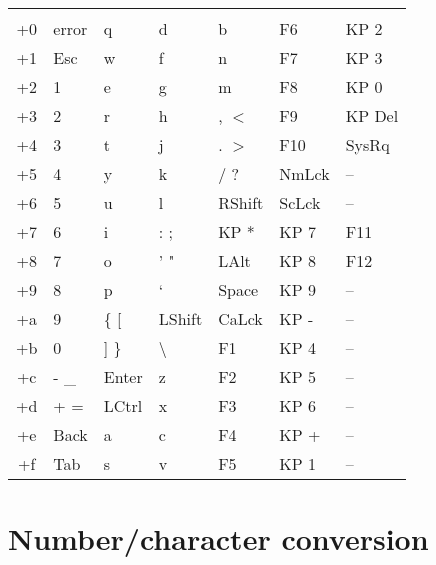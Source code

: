 \documentclass{refcard}
\begin{document}

\newcommand{\ppkey}{\textbackslash{} \textbar}

\begin{tabular}{C@{\hspace{6ex}}llllll}
	   &  &  &  &  &  &  \\[1ex]
	+0 & error  & q      & d      & b      & F6     & KP 2   \\
	+1 & Esc    & w      & f      & n      & F7     & KP 3   \\
	+2 & 1      & e      & g      & m      & F8     & KP 0   \\
	+3 & 2      & r      & h      & , $<$  & F9     & KP Del \\

	+4 & 3      & t      & j      & . $>$  & F10    & SysRq  \\
	+5 & 4      & y      & k      & / ?    & NmLck  & --     \\
	+6 & 5      & u      & l      & RShift & ScLck  & --     \\
	+7 & 6      & i      & : ;    & KP *   & KP 7   & F11    \\

	+8 & 7      & o      & ' "    & LAlt   & KP 8   & F12    \\
	+9 & 8      & p      & ` ~    & Space  & KP 9   & --     \\
	+a & 9      & \{ [   & LShift & CaLck  & KP -   & --     \\
	+b & 0      & ] \}   & \ppkey & F1     & KP 4   & --     \\

	+c & - \_   & Enter  & z      & F2     & KP 5   & --     \\
	+d & + =    & LCtrl  & x      & F3     & KP 6   & --     \\
	+e & Back   & a      & c      & F4     & KP +   & --     \\
	+f & Tab    & s      & v      & F5     & KP 1   & --     \\
\end{tabular}


\section{Number/character conversion}
\end{document}
